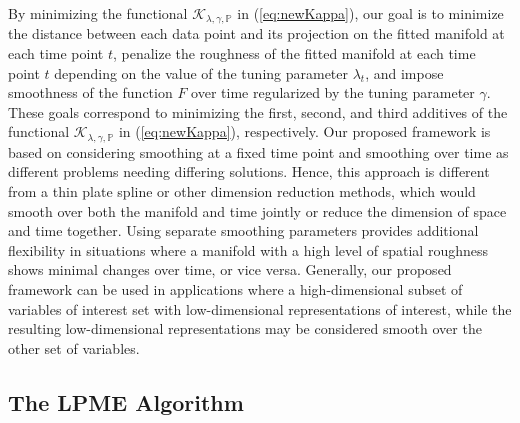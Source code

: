 \documentclass[11pt,reqno]{article}
\theoremstyle{definition}
\begin{document}
By minimizing the functional $\mathcal{K}_{\lambda, \gamma, \mathbb{P}}$ in (\ref{eq:newKappa}), our goal is to minimize the distance between each data point and its projection on the fitted manifold at each time point $t$, penalize the roughness of the fitted manifold at each time point $t$ depending on the value of the tuning parameter $\lambda_t$, and impose smoothness of the function $F$ over time regularized by the tuning parameter $\gamma$. These goals correspond to minimizing the first, second, and third additives of the functional $\mathcal{K}_{\lambda, \gamma, \mathbb{P}}$ in (\ref{eq:newKappa}), respectively. Our proposed framework is based on considering smoothing at a fixed time point and smoothing over time as different problems needing differing solutions. Hence, this approach is different from a thin plate spline or other dimension reduction methods, which would smooth over both the manifold and time jointly or reduce the dimension of space and time together. Using separate smoothing parameters provides additional flexibility in situations where a manifold with a high level of spatial roughness shows minimal changes over time, or vice versa. Generally, our proposed framework can be used in applications where a high-dimensional subset of variables of interest set with low-dimensional representations of interest, while the resulting low-dimensional representations may be considered smooth over the other set of variables.







\subsection{The LPME Algorithm}
\end{document}
